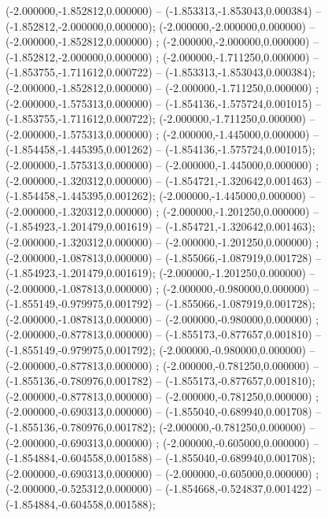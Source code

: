  (-2.000000,-1.852812,0.000000) -- (-1.853313,-1.853043,0.000384) -- (-1.852812,-2.000000,0.000000);
 (-2.000000,-2.000000,0.000000) -- (-2.000000,-1.852812,0.000000) ;
 (-2.000000,-2.000000,0.000000) -- (-1.852812,-2.000000,0.000000) ;
 (-2.000000,-1.711250,0.000000) -- (-1.853755,-1.711612,0.000722) -- (-1.853313,-1.853043,0.000384);
 (-2.000000,-1.852812,0.000000) -- (-2.000000,-1.711250,0.000000) ;
 (-2.000000,-1.575313,0.000000) -- (-1.854136,-1.575724,0.001015) -- (-1.853755,-1.711612,0.000722);
 (-2.000000,-1.711250,0.000000) -- (-2.000000,-1.575313,0.000000) ;
 (-2.000000,-1.445000,0.000000) -- (-1.854458,-1.445395,0.001262) -- (-1.854136,-1.575724,0.001015);
 (-2.000000,-1.575313,0.000000) -- (-2.000000,-1.445000,0.000000) ;
 (-2.000000,-1.320312,0.000000) -- (-1.854721,-1.320642,0.001463) -- (-1.854458,-1.445395,0.001262);
 (-2.000000,-1.445000,0.000000) -- (-2.000000,-1.320312,0.000000) ;
 (-2.000000,-1.201250,0.000000) -- (-1.854923,-1.201479,0.001619) -- (-1.854721,-1.320642,0.001463);
 (-2.000000,-1.320312,0.000000) -- (-2.000000,-1.201250,0.000000) ;
 (-2.000000,-1.087813,0.000000) -- (-1.855066,-1.087919,0.001728) -- (-1.854923,-1.201479,0.001619);
 (-2.000000,-1.201250,0.000000) -- (-2.000000,-1.087813,0.000000) ;
 (-2.000000,-0.980000,0.000000) -- (-1.855149,-0.979975,0.001792) -- (-1.855066,-1.087919,0.001728);
 (-2.000000,-1.087813,0.000000) -- (-2.000000,-0.980000,0.000000) ;
 (-2.000000,-0.877813,0.000000) -- (-1.855173,-0.877657,0.001810) -- (-1.855149,-0.979975,0.001792);
 (-2.000000,-0.980000,0.000000) -- (-2.000000,-0.877813,0.000000) ;
 (-2.000000,-0.781250,0.000000) -- (-1.855136,-0.780976,0.001782) -- (-1.855173,-0.877657,0.001810);
 (-2.000000,-0.877813,0.000000) -- (-2.000000,-0.781250,0.000000) ;
 (-2.000000,-0.690313,0.000000) -- (-1.855040,-0.689940,0.001708) -- (-1.855136,-0.780976,0.001782);
 (-2.000000,-0.781250,0.000000) -- (-2.000000,-0.690313,0.000000) ;
 (-2.000000,-0.605000,0.000000) -- (-1.854884,-0.604558,0.001588) -- (-1.855040,-0.689940,0.001708);
 (-2.000000,-0.690313,0.000000) -- (-2.000000,-0.605000,0.000000) ;
 (-2.000000,-0.525312,0.000000) -- (-1.854668,-0.524837,0.001422) -- (-1.854884,-0.604558,0.001588);
